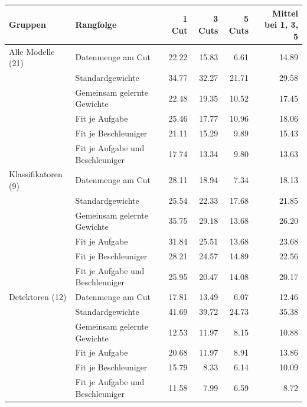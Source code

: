 \begin{tabular}{@{}llrrrr@{}}
\toprule
Gruppen & Rangfolge & 1 Cut & 3 Cuts & 5 Cuts & Mittel bei 1, 3, 5 \\
\midrule
Alle Modelle (21) & Datenmenge am Cut & 22.22 & 15.83 & 6.61 & 14.89 \\
 & Standardgewichte & 34.77 & 32.27 & 21.71 & 29.58 \\
 & Gemeinsam gelernte Gewichte & 22.48 & 19.35 & 10.52 & 17.45 \\
 & Fit je Aufgabe & 25.46 & 17.77 & 10.96 & 18.06 \\
 & Fit je Beschleuniger & 21.11 & 15.29 & 9.89 & 15.43 \\
 & Fit je Aufgabe und Beschleuniger & 17.74 & 13.34 & 9.80 & 13.63 \\
\midrule
Klassifikatoren (9) & Datenmenge am Cut & 28.11 & 18.94 & 7.34 & 18.13 \\
 & Standardgewichte & 25.54 & 22.33 & 17.68 & 21.85 \\
 & Gemeinsam gelernte Gewichte & 35.75 & 29.18 & 13.68 & 26.20 \\
 & Fit je Aufgabe & 31.84 & 25.51 & 13.68 & 23.68 \\
 & Fit je Beschleuniger & 28.21 & 24.57 & 14.89 & 22.56 \\
 & Fit je Aufgabe und Beschleuniger & 25.95 & 20.47 & 14.08 & 20.17 \\
\midrule
Detektoren (12) & Datenmenge am Cut & 17.81 & 13.49 & 6.07 & 12.46 \\
 & Standardgewichte & 41.69 & 39.72 & 24.73 & 35.38 \\
 & Gemeinsam gelernte Gewichte & 12.53 & 11.97 & 8.15 & 10.88 \\
 & Fit je Aufgabe & 20.68 & 11.97 & 8.91 & 13.86 \\
 & Fit je Beschleuniger & 15.79 & 8.33 & 6.14 & 10.09 \\
 & Fit je Aufgabe und Beschleuniger & 11.58 & 7.99 & 6.59 & 8.72 \\
\bottomrule
\end{tabular}
